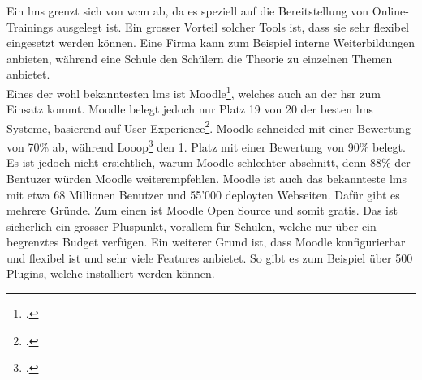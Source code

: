 Ein \gls{lms} grenzt sich von \gls{wcm} ab, da es speziell auf die Bereitstellung von Online-Trainings ausgelegt ist. Ein grosser Vorteil solcher Tools ist, dass sie sehr flexibel eingesetzt werden können. Eine Firma kann zum Beispiel interne Weiterbildungen anbieten, während eine Schule den Schülern die Theorie zu einzelnen Themen anbietet. \\

Eines der wohl bekanntesten \gls{lms} ist Moodle\footcite{moodle_homepage}, welches auch an der \gls{hsr} zum Einsatz kommt. Moodle belegt jedoch nur Platz 19 von 20 der besten \gls{lms} Systeme, basierend auf User Experience\footcite{moodle_ux}. Moodle schneided mit einer Bewertung von 70\% ab, während Looop\footcite{looop_homepage} den 1. Platz mit einer Bewertung von 90\% belegt. Es ist jedoch nicht ersichtlich, warum Moodle schlechter abschnitt, denn 88\% der Bentuzer würden Moodle weiterempfehlen. Moodle ist auch das bekannteste \gls{lms} mit etwa 68 Millionen Benutzer und 55'000 deployten Webseiten. Dafür gibt es mehrere Gründe. Zum einen ist Moodle Open Source und somit gratis. Das ist sicherlich ein grosser Pluspunkt, vorallem für Schulen, welche nur über ein begrenztes Budget verfügen. Ein weiterer Grund ist, dass Moodle konfigurierbar und flexibel ist und sehr viele Features anbietet. So gibt es zum Beispiel über 500 Plugins, welche installiert werden können. \\

%
%
%

